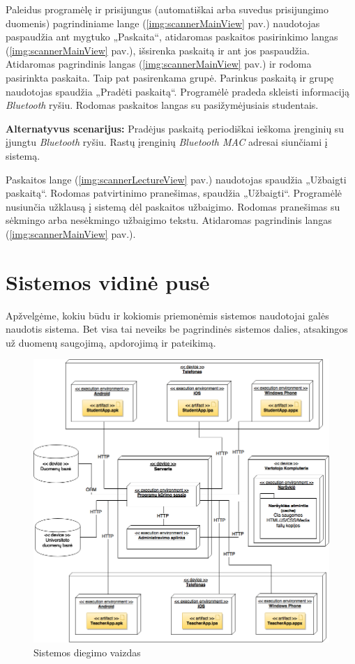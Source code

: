 \documentclass{VUMIFPSkursinis}
\begin{document}

Paleidus programėlę ir prisijungus (automatiškai arba suvedus prisijungimo duomenis) pagrindiniame lange (\ref{img:scannerMainView} pav.) naudotojas paspaudžia ant mygtuko „Paskaita“, atidaromas paskaitos pasirinkimo langas (\ref{img:scannerMainView} pav.), išsirenka paskaitą ir ant jos paspaudžia. Atidaromas pagrindinis langas (\ref{img:scannerMainView} pav.) ir rodoma pasirinkta paskaita. Taip pat pasirenkama grupė. Parinkus paskaitą ir grupę naudotojas spaudžia „Pradėti paskaitą“. Programėlė pradeda skleisti informaciją \textit{Bluetooth} ryšiu. Rodomas paskaitos langas su pasižymėjusiais studentais.

\textbf{Alternatyvus scenarijus:} Pradėjus paskaitą periodiškai ieškoma įrenginių su įjungtu \textit{Bluetooth} ryšiu. Rastų įrenginių \textit{Bluetooth MAC} adresai siunčiami į sistemą.


Paskaitos lange (\ref{img:scannerLectureView} pav.) naudotojas spaudžia „Užbaigti paskaitą“. Rodomas patvirtinimo pranešimas, spaudžia „Užbaigti“. Programėlė nusiunčia užklausą į sistemą dėl paskaitos užbaigimo. Rodomas pranešimas su sėkmingo arba nesėkmingo užbaigimo tekstu. Atidaromas pagrindinis langas (\ref{img:scannerMainView} pav.).

\section{Sistemos vidinė pusė}

Apžvelgėme, kokiu būdu ir kokiomis priemonėmis sistemos naudotojai galės naudotis sistema. Bet visa tai neveiks be pagrindinės sistemos dalies, atsakingos už duomenų saugojimą, apdorojimą ir pateikimą.

\begin{figure}[H]
	\centering
	\includegraphics[scale=0.5]{img/kursinio_deployment.png}
	\caption{Sistemos diegimo vaizdas}
	\label{img:deployment}
\end{figure}
\end{document}
